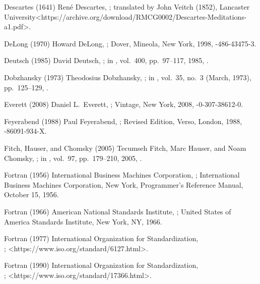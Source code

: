 \biblabel Descartes (1641)
René Descartes,
;
translated by John Veitch (1852),
\URL Lancaster University<https://archive.org/download/RMCG0002/Descartes-Meditations-a1.pdf>.

\biblabel DeLong (1970)
Howard DeLong,
;
Dover, Mineola, New York, 1998,
-486-43475-3.

\biblabel Deutsch (1985)
David Deutsch,
;
in ,
 vol.\ 400, pp.\ 97--117, 1985,
.

\biblabel Dobzhansky (1973)
Theodosius Dobzhansky,
;
in ,
 vol.\ 35, no.\ 3 (March, 1973), pp.\ 125--129,
.

\biblabel Everett (2008)
Daniel L.\ Everett,
;
Vintage, New York, 2008,
-0-307-38612-0.

\biblabel Feyerabend (1988)
Paul Feyerabend,
;
Revised Edition, Verso, London, 1988,
-86091-934-X.

\biblabel  Fitch, Hauser, and Chomsky (2005)
Tecumseh Fitch, Marc Hauser, and Noam Chomsky,
;
in ,
vol.\ 97, pp.\ 179--210, 2005,
.

\biblabel Fortran (1956)
International Business Machines Corporation,
;
International Business Machines Corporation, New York,
Programmer's Reference Manual, October 15, 1956.

\biblabel Fortran (1966)
American National Standards Institute,
;
United States of America Standards Institute, New York, NY, 1966.

\biblabel Fortran (1977)
International Organization for Standardization,\\
;
\URL<https://www.iso.org/standard/6127.html>.

\biblabel Fortran (1990)
International Organization for Standardization,\\
;
\URL<https://www.iso.org/standard/17366.html>.

